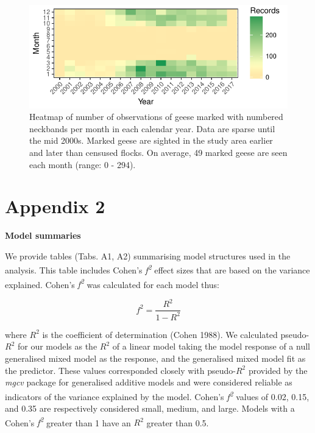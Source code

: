 \documentclass[10pt,twocolumn]{paper}
\begin{document}
\begin{figure}[H]
\includegraphics[width = 1.5\linewidth]{data_density_gorg.pdf}
\caption{{\small Heatmap of number of observations of geese marked with numbered neckbands per month in each calendar year. Data are sparse until the mid 2000s. Marked geese are sighted in the study area earlier and later than censused flocks. On average, 49 marked geese are seen each month (range: 0 - 294).}}

\end{figure}

\clearpage

\section{Appendix 2}\label{appendix-2}

\textbf{Model summaries}

We provide tables (Tabs. A1, A2) summarising model structures used in
the analysis. This table includes Cohen's \emph{f\textsuperscript{2}}
effect sizes that are based on the variance explained. Cohen's
\emph{f\textsuperscript{2}} was calculated for each model thus:

\begin{equation} f^2 =  \frac{R^2}{1 - R^2} \end{equation}

where \(R^2\) is the coefficient of determination (Cohen 1988). We
calculated pseudo-\(R^2\) for our models as the \(R^2\) of a linear
model taking the model response of a null generalised mixed model as the
response, and the generalised mixed model fit as the predictor. These
values corresponded closely with pseudo-\(R^2\) provided by the
\emph{mgcv} package for generalised additive models and were considered
reliable as indicators of the variance explained by the model. Cohen's
\emph{f\textsuperscript{2}} values of 0.02, 0.15, and 0.35 are
respectively considered small, medium, and large. Models with a Cohen's
\emph{f\textsuperscript{2}} greater than 1 have an \(R^2\) greater than
0.5.
\end{document}
